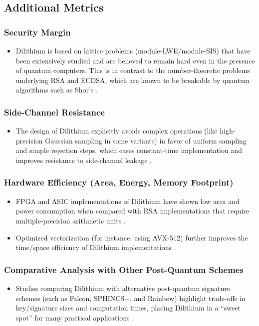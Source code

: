 \documentclass{article}
\begin{document}
\subsection{Additional Metrics}
\subsubsection{Security Margin}
\begin{itemize}
    \item Dilithium is based on lattice problems (module-LWE/module-SIS) that have been extensively studied and are believed to remain hard even in the presence of quantum computers. This is in contrast to the number-theoretic problems underlying RSA and ECDSA, which are known to be breakable by quantum algorithms such as Shor’s \cite{ref5, ref11}.
\end{itemize}

\subsubsection{Side-Channel Resistance}
\begin{itemize}
    \item The design of Dilithium explicitly avoids complex operations (like high-precision Gaussian sampling in some variants) in favor of uniform sampling and simple rejection steps, which eases constant-time implementation and improves resistance to side-channel leakage \cite{ref0}.
\end{itemize}

\subsubsection{Hardware Efficiency (Area, Energy, Memory Footprint)}
\begin{itemize}
    \item FPGA and ASIC implementations of Dilithium have shown low area and power consumption when compared with RSA implementations that require multiple-precision arithmetic units \cite{ref2, ref6}.
    \item Optimized vectorization (for instance, using AVX-512) further improves the time/space efficiency of Dilithium implementations \cite{ref9}.
\end{itemize}

\subsubsection{Comparative Analysis with Other Post-Quantum Schemes}
\begin{itemize}
    \item Studies comparing Dilithium with alternative post-quantum signature schemes (such as Falcon, SPHINCS+, and Rainbow) highlight trade-offs in key/signature sizes and computation times, placing Dilithium in a “sweet spot” for many practical applications \cite{ref1, ref3}.
\end{itemize}
\end{document}
